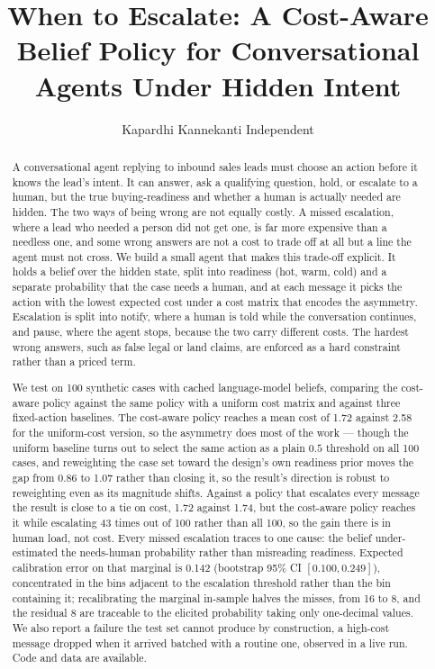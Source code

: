 \documentclass{article}
\title{When to Escalate: A Cost-Aware Belief Policy for Conversational Agents
Under Hidden Intent}
\author{
    Kapardhi Kannekanti
    \affiliations
    Independent
}
\begin{document}
\maketitle

\begin{abstract}
A conversational agent replying to inbound sales leads must choose an action
before it knows the lead's intent. It can answer, ask a qualifying question,
hold, or escalate to a human, but the true buying-readiness and whether a human
is actually needed are hidden. The two ways of being wrong are not equally
costly. A missed escalation, where a lead who needed a person did not get one,
is far more expensive than a needless one, and some wrong answers are not a cost
to trade off at all but a line the agent must not cross. We build a small agent
that makes this trade-off explicit. It holds a belief over the hidden state,
split into readiness (hot, warm, cold) and a separate probability that the case
needs a human, and at each message it picks the action with the lowest expected
cost under a cost matrix that encodes the asymmetry. Escalation is split into
notify, where a human is told while the conversation continues, and pause, where
the agent stops, because the two carry different costs. The hardest wrong
answers, such as false legal or land claims, are enforced as a hard constraint
rather than a priced term.

We test on 100 synthetic cases with cached language-model beliefs, comparing the
cost-aware policy against the same policy with a uniform cost matrix and against
three fixed-action baselines. The cost-aware policy reaches a mean cost of 1.72
against 2.58 for the uniform-cost version, so the asymmetry does most of the
work --- though the uniform baseline turns out to select the same action as a plain
$0.5$ threshold on all 100 cases, and reweighting the case set toward the design's
own readiness prior moves the gap from 0.86 to 1.07 rather than closing it, so the result's direction is robust to reweighting even as its magnitude shifts. Against a policy that escalates
every message the result is close to a tie
on cost, 1.72 against 1.74, but the cost-aware policy reaches it while escalating
43 times out of 100 rather than all 100, so the gain there is in human load, not
cost. Every missed escalation traces to one cause: the belief under-estimated the
needs-human probability rather than misreading readiness. Expected calibration error
on that marginal is 0.142 (bootstrap 95\% CI $[0.100, 0.249]$), concentrated in the
bins adjacent to the escalation threshold rather than the bin containing it;
recalibrating the marginal in-sample halves the misses, from 16 to 8, and the
residual 8 are traceable to the elicited probability taking only one-decimal values.
We
also report a failure the test set cannot produce by construction, a high-cost
message dropped when it arrived batched with a routine one, observed in a live
run. Code and data are available.
\end{abstract}
\end{document}
